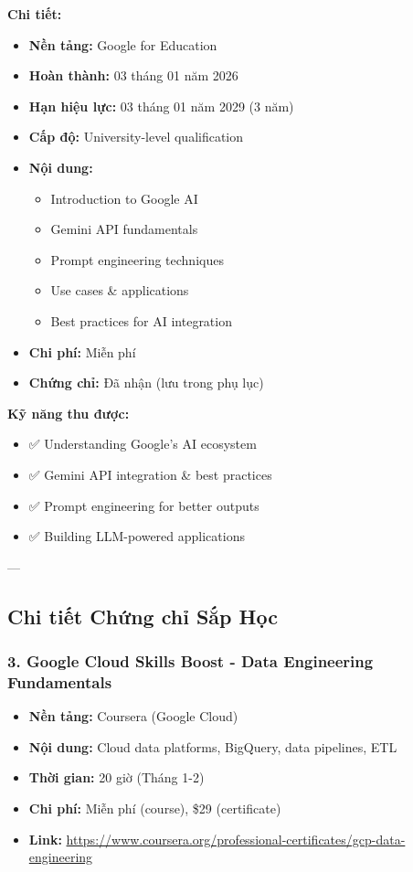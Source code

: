 \documentclass[12pt,a4paper]{article}
\begin{document}
\textbf{Chi tiết:}
\begin{itemize}
    \item \textbf{Nền tảng:} Google for Education
    \item \textbf{Hoàn thành:} 03 tháng 01 năm 2026
    \item \textbf{Hạn hiệu lực:} 03 tháng 01 năm 2029 (3 năm)
    \item \textbf{Cấp độ:} University-level qualification
    \item \textbf{Nội dung:}
    \begin{itemize}
        \item Introduction to Google AI
        \item Gemini API fundamentals
        \item Prompt engineering techniques
        \item Use cases \& applications
        \item Best practices for AI integration
    \end{itemize}
    \item \textbf{Chi phí:} Miễn phí
    \item \textbf{Chứng chỉ:} Đã nhận (lưu trong phụ lục)
\end{itemize}

\textbf{Kỹ năng thu được:}
\begin{itemize}
    \item ✅ Understanding Google's AI ecosystem
    \item ✅ Gemini API integration \& best practices
    \item ✅ Prompt engineering for better outputs
    \item ✅ Building LLM-powered applications
\end{itemize}

---

\subsection{Chi tiết Chứng chỉ Sắp Học}

\subsubsection{3. Google Cloud Skills Boost - Data Engineering Fundamentals}

\begin{itemize}
    \item \textbf{Nền tảng:} Coursera (Google Cloud)
    \item \textbf{Nội dung:} Cloud data platforms, BigQuery, data pipelines, ETL
    \item \textbf{Thời gian:} 20 giờ (Tháng 1-2)
    \item \textbf{Chi phí:} Miễn phí (course), \$29 (certificate)
    \item \textbf{Link:} \url{https://www.coursera.org/professional-certificates/gcp-data-engineering}
\end{itemize}
\end{document}
